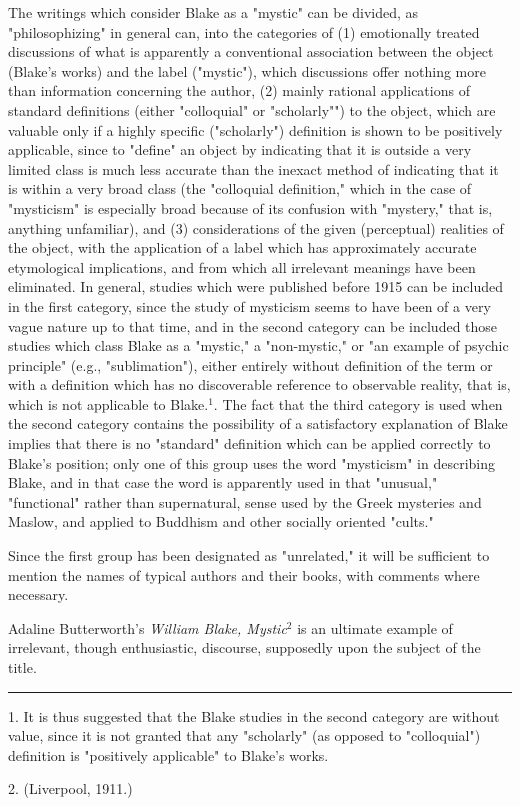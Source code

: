 The writings which consider Blake as a "mystic" can be
divided, as "philosophizing" in general can, into the categories of (1)
emotionally treated discussions of what is
apparently a conventional association between the object
(Blake's works) and the label ("mystic"), which discussions
offer nothing more than information concerning the author,
(2) mainly rational applications of standard definitions
(either "colloquial" or "scholarly"") to the object, which
are valuable only if a highly specific ("scholarly") definition
is shown to be positively applicable, since to "define" an
object by indicating that it is outside a very limited
class is much less accurate than the inexact method of
indicating that it is within a very broad class (the
"colloquial definition," which in the case of "mysticism" is
especially broad because of its confusion with "mystery," that
is, anything unfamiliar), and (3) considerations of the
given (perceptual) realities of the object, with the application
of a label which has approximately accurate etymological
implications, and from which all irrelevant meanings have
been eliminated. In general, studies which were published
before 1915 can be included in the first category, since the
study of mysticism seems to have been of a very vague nature
up to that time, and in the second category can be included
those studies which class Blake as a "mystic," a "non-mystic,"
or "an example of psychic principle" (e.g., "sublimation"),
either entirely without definition of the term or with a
definition which has no discoverable reference to observable
reality, that is, which is not applicable to Blake.$^{1}$. The
fact that the third category is used when the second category
contains the possibility of a satisfactory explanation of Blake
implies that there is no "standard" definition which
can be applied correctly to Blake's position; only one of this
group uses the word "mysticism" in describing Blake, and in
that case the word is apparently used in that "unusual,"
"functional" rather than supernatural, sense used by the Greek
mysteries and Maslow, and applied to Buddhism and other
socially oriented "cults."\par
\vspace{0.5\baselineskip}
Since the first group has been designated as "unrelated,"
it will be sufficient to mention the names of typical authors
and their books, with comments where necessary.\par
\vspace{0.5\baselineskip}
Adaline Butterworth's \textit{William Blake, Mystic}$^{2}$ is an
ultimate example of irrelevant, though enthusiastic, discourse, supposedly
upon the subject of the title.\par
\vspace*{\fill}
\noindent\rule{0.25\textwidth}{0.4pt}\par
1. It is thus suggested that the Blake studies in the
second category are without value, since it is not
granted that any "scholarly" (as opposed to "colloquial")
definition is "positively applicable" to Blake's works.\par
2. (Liverpool, 1911.)\par

